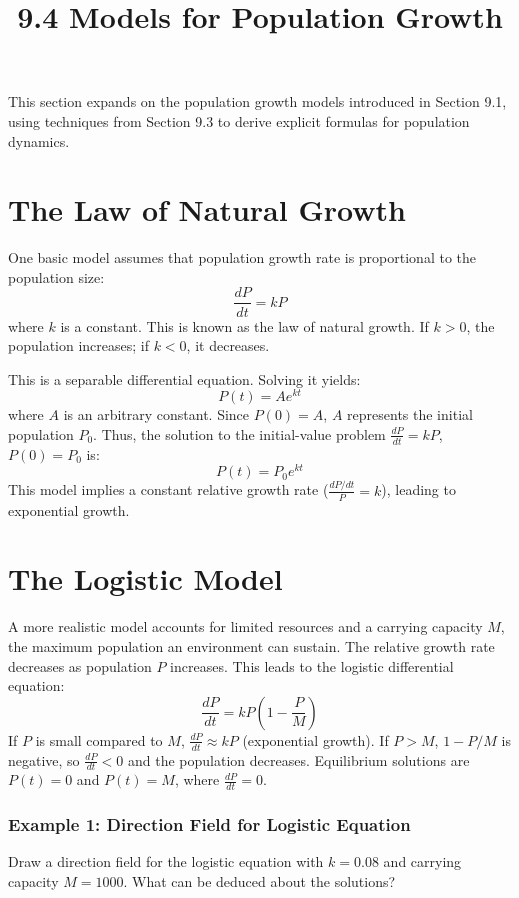 \documentclass{article}
\title{9.4 Models for Population Growth}
\author{}
\date{}
\begin{document}
\maketitle

This section expands on the population growth models introduced in Section 9.1, using techniques from Section 9.3 to derive explicit formulas for population dynamics.

\section*{The Law of Natural Growth}

One basic model assumes that population growth rate is proportional to the population size:
\[
\frac{dP}{dt} = kP
\]
where $k$ is a constant. 
This is known as the law of natural growth. If $k>0$, the population increases; if $k<0$, it decreases.

This is a separable differential equation. Solving it yields:
\[
P(t) = A e^{kt}
\]
where $A$ is an arbitrary constant.
Since $P(0)=A$, $A$ represents the initial population $P_0$.
Thus, the solution to the initial-value problem $\frac{dP}{dt} = kP$, $P(0)=P_0$ is:
\[
P(t) = P_0 e^{kt}
\]
This model implies a constant relative growth rate ($\frac{dP/dt}{P} = k$), leading to exponential growth.

\section*{The Logistic Model}

A more realistic model accounts for limited resources and a carrying capacity $M$, the maximum population an environment can sustain. 
The relative growth rate decreases as population $P$ increases. 
This leads to the logistic differential equation:
\[
\frac{dP}{dt} = kP\left(1 - \frac{P}{M}\right)
\]
If $P$ is small compared to $M$, $\frac{dP}{dt} \approx kP$ (exponential growth).
If $P > M$, $1 - P/M$ is negative, so $\frac{dP}{dt} < 0$ and the population decreases.
Equilibrium solutions are $P(t) = 0$ and $P(t) = M$, where $\frac{dP}{dt} = 0$.

\subsubsection*{Example 1: Direction Field for Logistic Equation}
Draw a direction field for the logistic equation with $k = 0.08$ and carrying capacity $M = 1000$. 
What can be deduced about the solutions?
\end{document}
